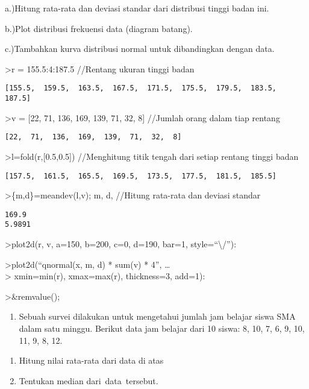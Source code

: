 \documentclass[
]{book}
\providecommand{\tightlist}{%
  \setlength{\itemsep}{0pt}\setlength{\parskip}{0pt}}
\begin{document}
a.)Hitung rata-rata dan deviasi standar dari distribusi tinggi badan ini.

b.)Plot distribusi frekuensi data (diagram batang).

c.)Tambahkan kurva distribusi normal untuk dibandingkan dengan data.

\textgreater r = 155.5:4:187.5 //Rentang ukuran tinggi badan

\begin{verbatim}
[155.5,  159.5,  163.5,  167.5,  171.5,  175.5,  179.5,  183.5,  187.5]
\end{verbatim}

\textgreater v = {[}22, 71, 136, 169, 139, 71, 32, 8{]} //Jumlah orang dalam tiap rentang

\begin{verbatim}
[22,  71,  136,  169,  139,  71,  32,  8]
\end{verbatim}

\textgreater l=fold(r,{[}0.5,0.5{]}) //Menghitung titik tengah dari setiap rentang tinggi badan

\begin{verbatim}
[157.5,  161.5,  165.5,  169.5,  173.5,  177.5,  181.5,  185.5]
\end{verbatim}

\textgreater\{m,d\}=meandev(l,v); m, d, //Hitung rata-rata dan deviasi standar

\begin{verbatim}
169.9
5.9891
\end{verbatim}

\textgreater plot2d(r, v, a=150, b=200, c=0, d=190, bar=1, style=``\textbackslash/''):

\textgreater plot2d(``qnormal(x, m, d) * sum(v) * 4'', \ldots{}\\
\textgreater{} xmin=min(r), xmax=max(r), thickness=3, add=1):

\textgreater\&remvalue();

\begin{enumerate}
\def\labelenumi{\arabic{enumi}.}
\setcounter{enumi}{5}
\tightlist
\item
  Sebuah survei dilakukan untuk mengetahui jumlah jam belajar siswa SMA dalam satu minggu. Berikut data jam belajar dari 10 siswa: 8, 10, 7, 6, 9, 10, 11, 9, 8, 12.
\end{enumerate}

\begin{enumerate}
\def\labelenumi{\alph{enumi})}
\item
  Hitung nilai rata-rata dari data di atas
\item
  Tentukan median dari~data~tersebut.
\end{enumerate}
\end{document}
